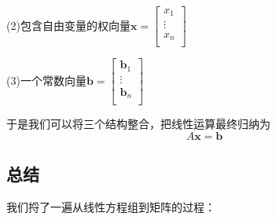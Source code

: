 \documentclass[fontset=none]{ctexart}
\begin{document}
(2)包含自由变量的权向量$\boldsymbol{x}=\left[ \begin{array}{c}
	x_1\\
	\vdots\\
	x_n\\
\end{array} \right] $

(3)一个常数向量$\boldsymbol{b}=\left[ \begin{array}{c}
	\boldsymbol{b}_1\\
	\vdots\\
	\boldsymbol{b}_n\\
\end{array} \right] $

于是我们可以将三个结构整合，把线性运算最终归纳为$$A\boldsymbol{x}=\boldsymbol{b}$$

\subsection{总结}
我们捋了一遍从线性方程组到矩阵的过程：
\end{document}
